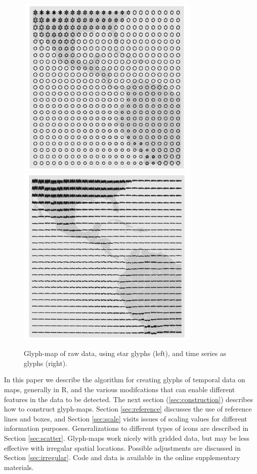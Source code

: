 \documentclass[oneside]{article}
\begin{document}
\begin{figure}[htp]
\centerline{\includegraphics[width=3.5in]{nasa-glyph-all.pdf}\includegraphics[width=3.5in]{nasa-glyph-ts-all.pdf}}
\caption{Glyph-map of raw data, using star glyphs (left), and time series as glyphs (right).}
\label{fig:glyph-map}
\end{figure}

In this paper we describe the algorithm for creating glyphs of temporal data on maps, generally in R, and the various modifcations that can enable different features in the data to be detected. The next section (\ref{sec:construction}) describes how to construct glyph-maps. Section \ref{sec:reference} discusses the use of reference lines and boxes, and Section \ref{sec:scale} visits issues of scaling values for different information purposes. Generalizations to different types of icons are described in Section \ref{sec:scatter}. Glyph-maps work nicely with gridded data, but may be less effective with irregular spatial locations. Possible adjustments are discussed in Section \ref{sec:irregular}. Code and data is available in the online supplementary materials.
 
\end{document}
